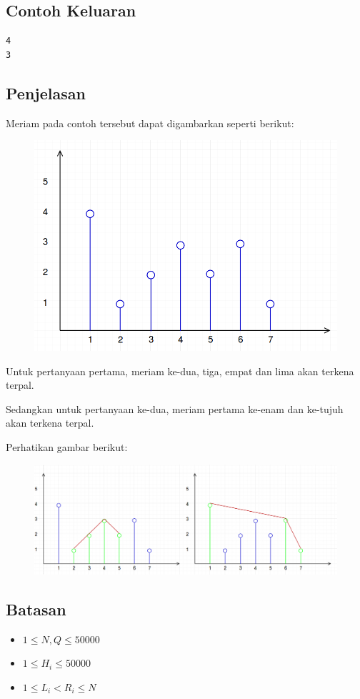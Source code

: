 \documentclass{article}
\begin{document}
\subsection*{Contoh Keluaran}

\begin{lstlisting}
4
3
\end{lstlisting}

\subsection*{Penjelasan}

\par\noindent Meriam pada contoh tersebut dapat digambarkan seperti berikut:

\begin{figure}[h!]
	\centering
	\includegraphics[width=0.4\linewidth]{meriam_sample1.png}
\end{figure}

\par\noindent Untuk pertanyaan pertama, meriam ke-dua, tiga, empat dan lima akan terkena terpal.
\par\noindent Sedangkan untuk pertanyaan ke-dua, meriam pertama ke-enam dan ke-tujuh akan terkena terpal.
\par\noindent Perhatikan gambar berikut:

\begin{figure}[h!]
	\centering
	\includegraphics[width=0.7\linewidth]{meriam_sample2.png}
\end{figure}

\subsection*{Batasan}

\begin{itemize}
	\item $1 \leq N, Q \leq 50000$
	\item $1 \leq H_i \leq 50000$
	\item $1 \leq L_i < R_i \leq N$
\end{itemize}
\end{document}
